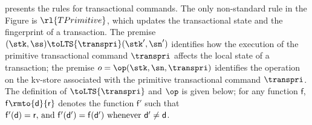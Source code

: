  presents the rules for transactional commands. 
The only non-standard rule in the Figure is \( \rl{TPrimitive} \), which updates 
the transactional state and the fingerprint of a transaction. The premise 
$(\stk, \ss) \toLTS{\transpri} (\stk', \sn')$ identifies how the 
execution of the primitive transactional command $\transpri$ affects the local state 
of a transaction; the premise $o =\op(\stk, \sn, \transpri)$ identifies the operation on the 
kv-store associated with the primitive transactional command $\transpri$. The definition 
of $\toLTS{\transpri}$ and $\op$ is given below; 
for any function \( \mathsf f \), \( \mathsf f \rmto{\mathsf d}{\mathsf r}\) denotes the 
function \( {\mathsf f}'\) such that  \( {\mathsf f}'( {\mathsf d}) = {\mathsf r}$, and \( {\mathsf f}'({\mathsf d}') = {\mathsf f}({\mathsf d}')$ whenever \( 
{\mathsf d}' \neq {\mathsf d}\). 

